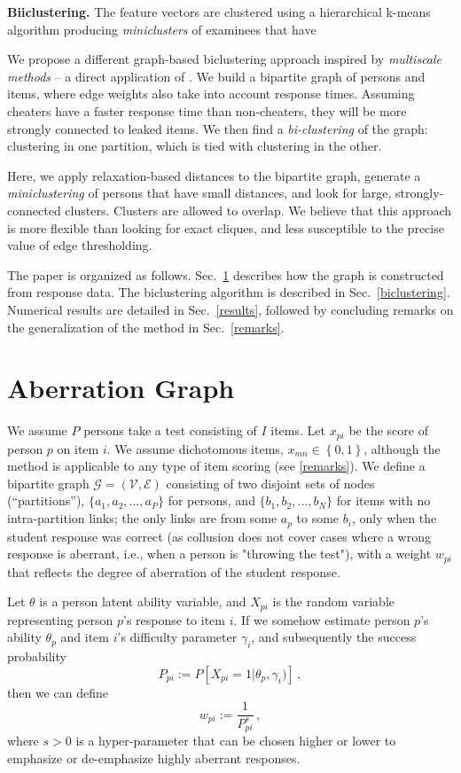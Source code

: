 \documentclass{article}
\newcommand{\cE}{\mathcal{E}}
\newcommand{\cG}{\mathcal{G}}
\newcommand{\cV}{\mathcal{V}}
\begin{document}
{\bf Biiclustering.} The feature vectors are clustered using a hierarchical k-means algorithm producing {\it miniclusters} of examinees that have 



We propose a different graph-based biclustering approach inspired by {\it multiscale methods} -- a direct application of \cite[Sec.~10]{msgd}. We build a bipartite graph of persons and items, where edge weights also take into account response times. Assuming cheaters have a faster response time than non-cheaters, they will be more strongly connected to leaked items. We then find a {\it bi-clustering} of the graph: clustering in one partition, which is tied with clustering in the other.

 Here, we apply relaxation-based distances to the bipartite graph, generate a {\it miniclustering} of persons that have small distances, and look for large, strongly-connected clusters. Clusters are allowed to overlap. We believe that this approach is more flexible than looking for exact cliques, and less susceptible to the precise value of edge thresholding.

The paper is organized as follows. Sec.~\ref{model} describes how the graph is constructed from response data. The biclustering algorithm is described in Sec.~\ref{biclustering}. Numerical results are detailed in Sec.~\ref{results}, followed by concluding remarks on the generalization of the method in Sec.~\ref{remarks}.

\section{Aberration Graph}
\label{model}
We assume $P$ persons take a test consisting of $I$ items. Let $x_{pi}$ be the score of person $p$ on item $i$. We assume dichotomous items, $x_{mn} \in \left\{0,1\right\}$, although the method is applicable to any type of item scoring (see \ref{remarks}). We define a bipartite graph $\cG = (\cV, \cE)$ consisting of two disjoint sets of nodes (``partitions''), $\{a_1,a_2,\ldots,a_P\}$ for persons, and $\{b_1,b_2,\ldots,b_N\}$ for items with no intra-partition links; the only links are from some $a_p$ to some $b_i$, only when the student response was correct (as collusion does not cover cases where a wrong response is aberrant, i.e., when a person is "throwing the test"), with a weight $w_{pi}$ that reflects the degree of aberration of the student response.

Let $\theta$ is a person latent ability variable, and $X_{pi}$ is the random variable representing person $p$'s response to item $i$. If we somehow estimate person $p$'s ability $\theta_p$ and item $i$'s difficulty parameter $\gamma_i$, and subsequently the success probability
\begin{equation}
	P_{pi} := P \left [X_{pi}=1 | \theta_p, \gamma_i) \right]\,,
	\label{ppi} 
\end{equation}
then we can define
\begin{equation}
  w_{pi} := \frac{1}{P_{pi}^s} \,,
  \label{weight}
\end{equation}
where $s  > 0$ is a hyper-parameter that can be chosen higher or lower to emphasize or de-emphasize highly aberrant responses. 
\end{document}
